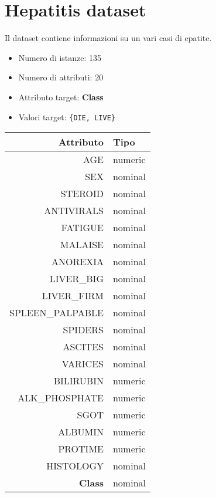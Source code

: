 \pagebreak

\section{Hepatitis dataset}

Il dataset contiene informazioni su un vari casi di epatite.


\begin{itemize}
	\item Numero di istanze: 135
	\item Numero di attributi: 20
	\item Attributo target: \textbf{Class}
	\item Valori target: \texttt{\{DIE, LIVE\}}
\end{itemize}

\begin{table}[ht]
	\centering
	\begin{tabular}{|r|l|}
		\hline
		Attributo & Tipo \\
		\hline
		AGE & numeric \\
		SEX & nominal \\
		STEROID & nominal \\
		ANTIVIRALS & nominal \\
		FATIGUE & nominal \\
		MALAISE & nominal \\
		ANOREXIA & nominal \\
		LIVER\_BIG & nominal \\
		LIVER\_FIRM & nominal \\
		SPLEEN\_PALPABLE & nominal \\
		SPIDERS & nominal \\
		ASCITES & nominal \\
		VARICES & nominal \\
		BILIRUBIN & numeric \\
		ALK\_PHOSPHATE & numeric \\
		SGOT & numeric \\
		ALBUMIN & numeric \\
		PROTIME & numeric \\
		HISTOLOGY & nominal \\
		\textbf{Class} & nominal \\
		\hline
	\end{tabular}
\end{table}

\pagebreak

